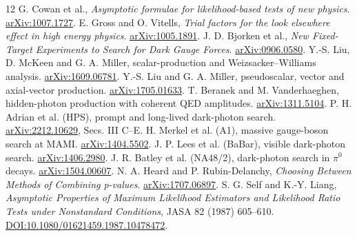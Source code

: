 \documentclass[11pt,letterpaper]{article}
\begin{document}
\begingroup\footnotesize
\begin{thebibliography}{12}
 G. Cowan et al., \emph{Asymptotic formulae for likelihood-based tests of new physics}. \href{https://arxiv.org/abs/1007.1727}{arXiv:1007.1727}.
 E. Gross and O. Vitells, \emph{Trial factors for the look elsewhere effect in high energy physics}. \href{https://arxiv.org/abs/1005.1891}{arXiv:1005.1891}.
 J. D. Bjorken et al., \emph{New Fixed-Target Experiments to Search for Dark Gauge Forces}. \href{https://arxiv.org/abs/0906.0580}{arXiv:0906.0580}.
 Y.-S. Liu, D. McKeen and G. A. Miller, scalar-production and Weizsacker--Williams analysis. \href{https://arxiv.org/abs/1609.06781}{arXiv:1609.06781}.
 Y.-S. Liu and G. A. Miller, pseudoscalar, vector and axial-vector production. \href{https://arxiv.org/abs/1705.01633}{arXiv:1705.01633}.
 T. Beranek and M. Vanderhaeghen, hidden-photon production with coherent QED amplitudes. \href{https://arxiv.org/abs/1311.5104}{arXiv:1311.5104}.
 P. H. Adrian et al. (HPS), prompt and long-lived dark-photon search. \href{https://arxiv.org/abs/2212.10629}{arXiv:2212.10629}, Secs. III C--E.
 H. Merkel et al. (A1), massive gauge-boson search at MAMI. \href{https://arxiv.org/abs/1404.5502}{arXiv:1404.5502}.
 J. P. Lees et al. (BaBar), visible dark-photon search. \href{https://arxiv.org/abs/1406.2980}{arXiv:1406.2980}.
 J. R. Batley et al. (NA48/2), dark-photon search in $\pi^0$ decays. \href{https://arxiv.org/abs/1504.00607}{arXiv:1504.00607}.
 N. A. Heard and P. Rubin-Delanchy, \emph{Choosing Between Methods of Combining p-values}. \href{https://arxiv.org/abs/1707.06897}{arXiv:1707.06897}.
 S. G. Self and K.-Y. Liang, \emph{Asymptotic Properties of Maximum Likelihood Estimators and Likelihood Ratio Tests under Nonstandard Conditions}, JASA 82 (1987) 605--610. \href{https://doi.org/10.1080/01621459.1987.10478472}{DOI:10.1080/01621459.1987.10478472}.
\end{thebibliography}\endgroup
\end{document}
